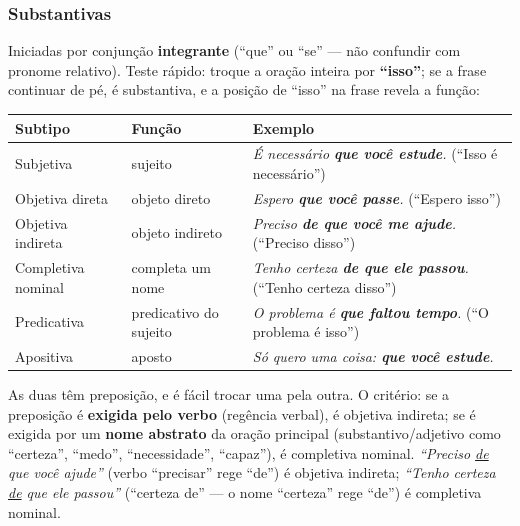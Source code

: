 \subsubsection{Substantivas}
\label{sec:substantivas}

\begin{conceito}
Iniciadas por conjunção \textbf{integrante} (“que” ou “se” --- não confundir
com pronome relativo). Teste rápido: troque a oração inteira por
\textbf{“isso”}; se a frase continuar de pé, é substantiva, e a posição de
“isso” na frase revela a função:

\begin{center}
\begin{tabular}{@{}p{2.6cm}p{2.8cm}p{6.6cm}@{}}
\toprule
\textbf{Subtipo} & \textbf{Função} & \textbf{Exemplo} \\
\midrule
Subjetiva & sujeito & \textit{É necessário \textbf{que você estude}.} (“Isso é necessário”) \\
Objetiva direta & objeto direto & \textit{Espero \textbf{que você passe}.} (“Espero isso”) \\
Objetiva indireta & objeto indireto & \textit{Preciso \textbf{de que você me ajude}.} (“Preciso disso”) \\
Completiva nominal & completa um nome & \textit{Tenho certeza \textbf{de que ele passou}.} (“Tenho certeza disso”) \\
Predicativa & predicativo do sujeito & \textit{O problema é \textbf{que faltou tempo}.} (“O problema é isso”) \\
Apositiva & aposto & \textit{Só quero uma coisa: \textbf{que você estude}.} \\
\bottomrule
\end{tabular}
\end{center}
\end{conceito}

\begin{cuidado}
As duas têm preposição, e é fácil trocar uma pela outra. O critério: se a
preposição é \textbf{exigida pelo verbo} (regência verbal), é objetiva
indireta; se é exigida por um \textbf{nome abstrato} da oração principal
(substantivo/adjetivo como “certeza”, “medo”, “necessidade”, “capaz”), é
completiva nominal. \textit{“Preciso \underline{de} que você ajude”} (verbo
“precisar” rege “de”) é objetiva indireta; \textit{“Tenho certeza
\underline{de} que ele passou”} (“certeza de” --- o nome “certeza” rege “de”)
é completiva nominal.
\end{cuidado}

